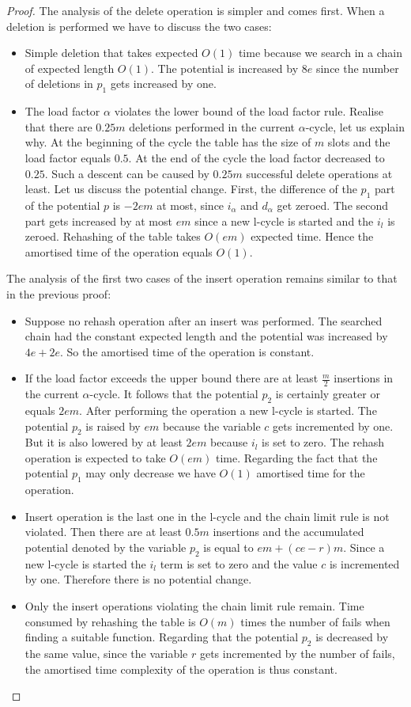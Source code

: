 \begin{proof}
The analysis of the delete operation is simpler and comes first. When a deletion is performed we have to discuss the two cases:
\begin{itemize}
\item Simple deletion that takes expected $O(1)$ time because we search in a chain of expected length $O(1)$. The potential is increased by $8e$ since the number of deletions in $p_1$ gets increased by one.
\item The load factor $\alpha$ violates the lower bound of the load factor rule. Realise that there are $0.25 m$ deletions performed in the current $\alpha$-cycle, let us explain why. At the beginning of the cycle the table has the size of $m$ slots and the load factor equals $0.5$. At the end of the cycle the load factor decreased to $0.25$. Such a descent can be caused by $0.25 m$ successful delete operations at least. Let us discuss the potential change. First, the difference of the $p_1$ part of the potential $p$ is $-2em$ at most, since $i_{\alpha}$ and $d_{\alpha}$ get zeroed. The second part gets increased by at most $em$ since a new l-cycle is started and the $i_l$ is zeroed. Rehashing of the table takes $O(em)$ expected time. Hence the amortised time of the operation equals $O(1)$. 
\end{itemize}

The analysis of the first two cases of the insert operation remains similar to that in the previous proof:
\begin{itemize}
\item Suppose no rehash operation after an insert was performed. The searched chain had the constant expected length and the potential was increased by $4e + 2e$. So the amortised time of the operation is constant.
\item If the load factor exceeds the upper bound there are at least $\frac{m}{2}$ insertions in the current $\alpha$-cycle. It follows that the potential $p_2$ is certainly greater or equals $2em$. After performing the operation a new l-cycle is started. The potential $p_2$ is raised by $em$ because the variable $c$ gets incremented by one. But it is also lowered by at least $2em$ because $i_l$ is set to zero. The rehash operation is expected to take $O(em)$ time. Regarding the fact that the potential $p_1$ may only decrease we have $O(1)$ amortised time for the operation.
\item Insert operation is the last one in the l-cycle and the chain limit rule is not violated. Then there are at least $0.5 m$ insertions and the accumulated potential denoted by the variable $p_2$ is equal to $em + (ce - r)m$. Since a new l-cycle is started the $i_l$ term is set to zero and the value $c$ is incremented by one. Therefore there is no potential change.
\item Only the insert operations violating the chain limit rule remain. Time consumed by rehashing the table is $O(m)$ times the number of fails when finding a suitable function. Regarding that the potential $p_2$ is decreased by the same value, since the variable $r$ gets incremented by the number of fails, the amortised time complexity of the operation is thus constant. 


\end{itemize}
\end{proof}
